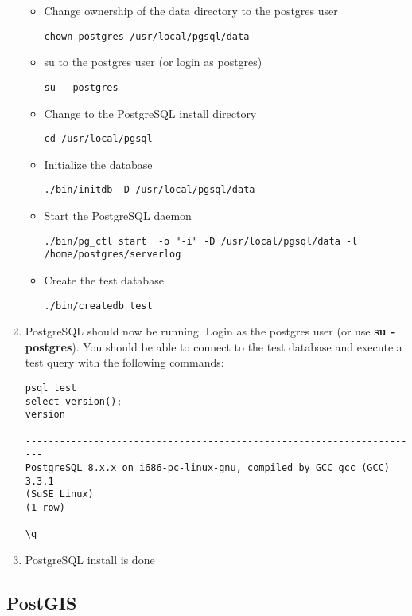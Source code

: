 \begin{enumerate}
\begin{itemize}
\item Change ownership of the data directory to the postgres user
\begin{verbatim}
chown postgres /usr/local/pgsql/data
\end{verbatim}

\item su to the postgres user (or login as postgres)
\begin{verbatim}
su - postgres
\end{verbatim}

\item Change to the PostgreSQL install directory 
\begin{verbatim}
cd /usr/local/pgsql
\end{verbatim}

\item Initialize the database 
\begin{verbatim}
./bin/initdb -D /usr/local/pgsql/data
\end{verbatim}

\item Start the PostgreSQL daemon 
\small
\begin{verbatim}
./bin/pg_ctl start  -o "-i" -D /usr/local/pgsql/data -l
/home/postgres/serverlog 
\end{verbatim} 
  
\item Create the test database
\begin{verbatim}
./bin/createdb test
\end{verbatim}
\normalsize
\end{itemize}
\item PostgreSQL should now be running. Login as the postgres user (or
use \textbf{su - postgres}). You should be able to connect to the test database and
execute a test query with the following commands: 

\begin{verbatim}
psql test
select version();
version

----------------------------------------------------------------------
PostgreSQL 8.x.x on i686-pc-linux-gnu, compiled by GCC gcc (GCC) 3.3.1
(SuSE Linux)
(1 row)

\q
\end{verbatim}


\item PostgreSQL install is done
\end{enumerate}

%
%
\subsection{PostGIS}\label{label_postgis_source}

